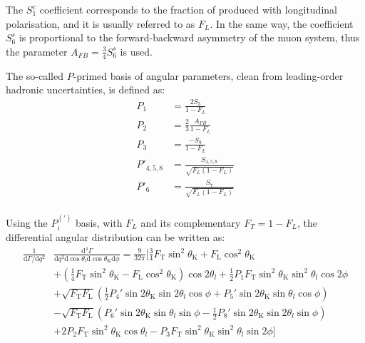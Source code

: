 The $S_1^c$ coefficient corresponds to the fraction of \Ks produced with longitudinal polarisation, and it is usually referred to as $F_L$.
In the same way, the coefficient $S_6^s$ is proportional to the forward-backward asymmetry of the muon system, thus the parameter $A_{FB}=\frac{3}{4}S_6^s$ is used.

The so-called $P$-primed basis of angular parameters, clean from leading-order hadronic uncertainties, is defined as:
\begin{equation}\label{eq:defPPrime}
  \begin{split}
    P_1 &= \frac{2S_3}{1-F_L}\\
    P_2 &= \frac{2}{3}\frac{A_{FB}}{1-F_L}\\
    P_3 &= \frac{-S_9}{1-F_L}\\
    P'_{4,5,8} &= \frac{S_{4,5,8}}{\sqrt{F_L(1-F_L)}}\\
    P'_6 &= \frac{S_7}{\sqrt{F_L(1-F_L)}}\\
  \end{split}
\end{equation}

Using the $P_i^{(\prime)}$ basis, with $F_L$ and its complementary $F_T=1-F_L$, the differential angular distribution can be written as:
\begin{equation} \label{eq:Angular}
  \begin{split}
    \frac{1}{\mathrm{d}\Gamma/\mathrm{d}q^2}&\frac{\mathrm{d}^4\Gamma}{\mathrm{d}q^2 \mathrm{d}\cos\theta_l \mathrm{d}\cos\theta_\mathrm{K} \mathrm{d}\phi} =\frac{9}{32\pi}\bigg[\frac{3}{4}F_\mathrm{T}\sin^2\theta_\mathrm{K} + F_\mathrm{L}\cos^2\theta_\mathrm{K} \\
      &\left.+\left(\frac{1}{4}F_\mathrm{T}\sin^2\theta_\mathrm{K}-F_\mathrm{L}\cos^2\theta_\mathrm{K}\right)\cos2\theta_l+\frac{1}{2}P_1F_\mathrm{T}\sin^2\theta_\mathrm{K}\sin^2\theta_l\cos 2\phi \right.\\
      &+\sqrt{F_\mathrm{T}F_\mathrm{L}}\left(\frac{1}{2}P_4'\sin2\theta_\mathrm{K}\sin2\theta_l\cos\phi+P_5'\sin2\theta_\mathrm{K}\sin\theta_l\cos\phi \right)\\
      &-\sqrt{F_\mathrm{T}F_\mathrm{L}}\left(P_6'\sin2\theta_\mathrm{K}\sin\theta_l\sin\phi-\frac{1}{2}P_8'\sin2\theta_\mathrm{K}\sin2\theta_l\sin\phi \right)\\
      &+2P_2F_\mathrm{T}\sin^2\theta_\mathrm{K}\cos\theta_l-P_3F_\mathrm{T}\sin^2\theta_\mathrm{K}\sin^2\theta_l\sin2\phi \bigg]
  \end{split}
\end{equation}

